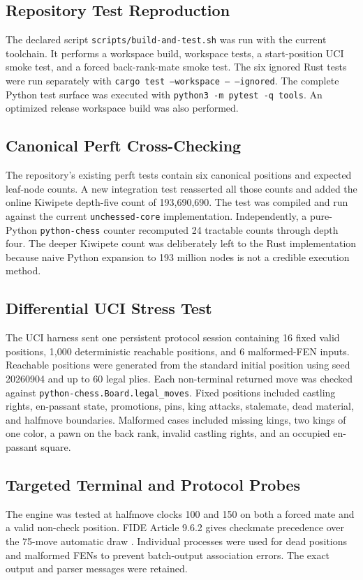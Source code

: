 \documentclass[conference]{IEEEtran}
\begin{document}
\subsection{Repository Test Reproduction}
The declared script \texttt{scripts/build-and-test.sh} was run with the current toolchain. It performs a workspace build, workspace tests, a start-position UCI smoke test, and a forced back-rank-mate smoke test. The six ignored Rust tests were run separately with \texttt{cargo test --workspace -- --ignored}. The complete Python test surface was executed with \texttt{python3 -m pytest -q tools}. An optimized release workspace build was also performed.

\subsection{Canonical Perft Cross-Checking}
The repository's existing perft tests contain six canonical positions and expected leaf-node counts. A new integration test reasserted all those counts and added the online Kiwipete depth-five count of 193,690,690. The test was compiled and run against the current \texttt{unchessed-core} implementation. Independently, a pure-Python \texttt{python-chess} counter recomputed 24 tractable counts through depth four. The deeper Kiwipete count was deliberately left to the Rust implementation because naive Python expansion to 193 million nodes is not a credible execution method.

\subsection{Differential UCI Stress Test}
The UCI harness sent one persistent protocol session containing 16 fixed valid positions, 1,000 deterministic reachable positions, and 6 malformed-FEN inputs. Reachable positions were generated from the standard initial position using seed 20260904 and up to 60 legal plies. Each non-terminal returned move was checked against \texttt{python-chess.Board.legal\_moves}. Fixed positions included castling rights, en-passant state, promotions, pins, king attacks, stalemate, dead material, and halfmove boundaries. Malformed cases included missing kings, two kings of one color, a pawn on the back rank, invalid castling rights, and an occupied en-passant square.

\subsection{Targeted Terminal and Protocol Probes}
The engine was tested at halfmove clocks 100 and 150 on both a forced mate and a valid non-check position. FIDE Article 9.6.2 gives checkmate precedence over the 75-move automatic draw \cite{fide}. Individual processes were used for dead positions and malformed FENs to prevent batch-output association errors. The exact output and parser messages were retained.
\end{document}
